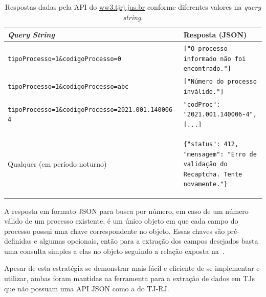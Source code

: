 \begin{table}[htb]
    \tiny
    \centering
    \begin{tabular}{lp{}}
        \toprule
        \textit{Query String} & Resposta (JSON) \\
        \midrule
        \texttt{tipoProcesso=1\&codigoProcesso=0} & \texttt{["O processo informado não foi encontrado."]} \\
        \texttt{tipoProcesso=1\&codigoProcesso=abc} & \texttt{["Número do processo inválido."]} \\
        \texttt{tipoProcesso=1\&codigoProcesso=2021.001.140006-4} & \texttt{{"codProc": "2021.001.140006-4", [...]}} \\
        Qualquer (em período noturno) & \begin{minipage}{0.6\textwidth}
            \begin{verbatim}
{"status": 412, "mensagem": "Erro de validação do Recaptcha. Tente novamente."}
            \end{verbatim}
        \end{minipage}
        \\
        \bottomrule
    \end{tabular}
    \caption{%
        Respostas dadas pela API do \url{ww3.tjrj.jus.br} conforme diferentes valores na \textit{query string}.
    }
    \label{tbl:respostas-ww3}
\end{table}

A resposta em formato JSON para busca por número, em caso de um número válido
de um processo existente, é um único objeto em que cada campo do processo
possui uma chave correspondente no objeto. Essas chaves são pré-definidas e
algumas opcionais, então para a extração dos campos desejados basta uma
consulta simples a elas no objeto seguindo a relação exposta
na~.

Apesar de esta estratégia se demonstrar mais fácil e eficiente de se
implementar e utilizar, ambas foram mantidas na ferramenta para a extração de
dados em TJs que não possuam uma API JSON como a do TJ-RJ.

